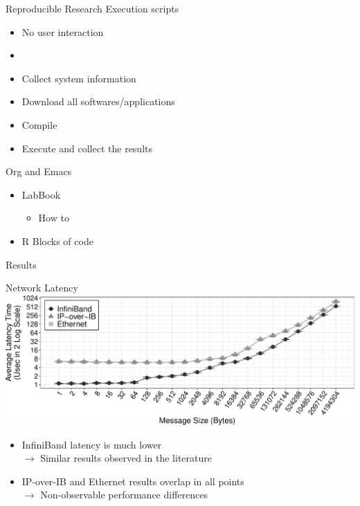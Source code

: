 \documentclass[presentation]{beamer}
\begin{document}
\begin{frame}{Reproducible Research}
\vfill
Execution scripts
\begin{itemize}
    \item No user interaction
    \item 
    \item Collect system information
    \item Download all softwares/applications
    \item Compile
    \item Execute and collect the results
\end{itemize}

Org and Emacs
\begin{itemize}
    \item LabBook
    \begin{itemize}
        \item How to
    \end{itemize}
    \item R Blocks of code
\end{itemize}
\end{frame}


\begin{frame} 
\begin{block}{}
\begin{center}
\Huge{Results}
\end{center}
\end{block}
\end{frame}

\begin{frame}{Network Latency}
\includegraphics[width=\textwidth]{SLIDES/img/Latency.pdf}
\begin{itemize}
    \item InfiniBand latency is much lower\\
        $\to$ Similar results observed in the literature
    \item\pause IP-over-IB and Ethernet results overlap in all points\\
        $\to$ Non-observable performance differences
\end{itemize}
\end{frame}
\end{document}
